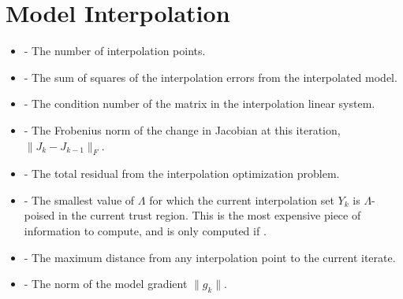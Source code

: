 \documentclass[letterpaper,10pt,english]{sphinxmanual}
\begin{document}
\section{Model Interpolation}
\label{\detokenize{diagnostic:model-interpolation}}\begin{itemize}
\item {} 
 - The number of interpolation points.

\item {} 
 - The sum of squares of the interpolation errors from the interpolated model.

\item {} 
 - The condition number of the matrix in the interpolation linear system.

\item {} 
 - The Frobenius norm of the change in Jacobian at this iteration, \(\|J_k-J_{k-1}\|_F\).

\item {} 
 - The total residual from the interpolation optimization problem.

\item {} 
 - The smallest value of \(\Lambda\) for which the current interpolation set \(Y_k\) is \(\Lambda\)-poised in the current trust region. This is the most expensive piece of information to compute, and is only computed if \sphinxcode{user\_params{[}'logging.save\_poisedness' = True}.

\item {} 
 - The maximum distance from any interpolation point to the current iterate.

\item {} 
 - The norm of the model gradient \(\|g_k\|\).

\end{itemize}
\end{document}
